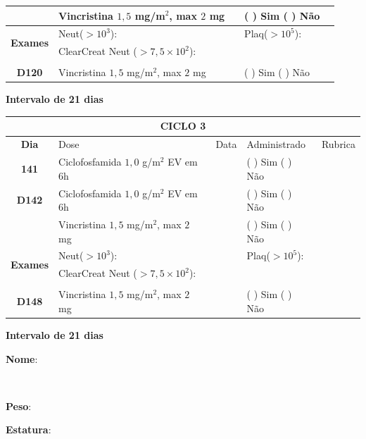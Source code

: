 \documentclass[11pt,a4paper,oldfontcommands]{memoir}
\def\entrywithlabel[#1]#2{\parbox{#1}{{\small #2:} \hrulefill}}
\begin{document}
\begin{center}
\begin{table}[H]
\begin{tabular}{p{1cm}p{6cm}|p{1cm}|p{3cm}|p{2.5cm}}
    \multicolumn{1}{c|}{\multirow{1}{*}{\textbf{}}}&{Vincristina \(1,5\) mg/m\(^2\), max \(2\) mg}&&{(  ) Sim (  ) Não}&\\
    \hline
    \multicolumn{1}{c|}{\multirow{2}{*}{\textbf{Exames}}}&\multicolumn{2}{l|}{Neut(\(>10^3\)):}&{Plaq(\(>10^5\)):}&\\
    \cline{2-5}
    \multicolumn{1}{c|}{\multirow{2}{*}{{}}}&\multicolumn{2}{l|}{ClearCreat Neut (\(>7,5\times10^2\)):}&{}&{}\\
    \hline
    \\
    \hline
    \multicolumn{1}{c|}{\multirow{1}{*}{\textbf{D120}}}&{Vincristina \(1,5\) mg/m\(^2\), max \(2\) mg}&&{(  ) Sim (  ) Não}&\\
    \hline
\end{tabular}
\end{table}
\textbf{Intervalo de 21 dias}

\begin{table}[H]
\begin{tabular}{p{1cm}p{6cm}|p{1cm}|p{3cm}|p{2.5cm}}
    \hline
	\multicolumn{5}{c}{\textbf{CICLO 3}}\\
	\hline
    \multicolumn{1}{c|}{\multirow{1}{*}{\textbf{Dia}}}&{Dose}&{Data}&{Administrado}&{Rubrica} \\
    \hline
    \multicolumn{1}{c|}{\multirow{1}{*}{\textbf{141}}}&{Ciclofosfamida \(1,0\) g/m\(^2\) EV em 6h}&&{(  ) Sim (  ) Não}&\\
    \multicolumn{1}{c|}{\multirow{1}{*}{\textbf{D142}}}&{Ciclofosfamida \(1,0\) g/m\(^2\) EV em 6h}&&{(  ) Sim (  ) Não}&\\
    \multicolumn{1}{c|}{\multirow{1}{*}{\textbf{}}}&{Vincristina \(1,5\) mg/m\(^2\), max \(2\) mg}&&{(  ) Sim (  ) Não}&\\
    \hline
    \multicolumn{1}{c|}{\multirow{2}{*}{\textbf{Exames}}}&\multicolumn{2}{l|}{Neut(\(>10^3\)):}&{Plaq(\(>10^5\)):}&\\
    \cline{2-5}
    \multicolumn{1}{c|}{\multirow{2}{*}{{}}}&\multicolumn{2}{l|}{ClearCreat Neut (\(>7,5\times10^2\)):}&{}&{}\\
    \hline
    \\
    \hline
    \multicolumn{1}{c|}{\multirow{1}{*}{\textbf{D148}}}&{Vincristina \(1,5\) mg/m\(^2\), max \(2\) mg}&&{(  ) Sim (  ) Não}&\\
    \hline
\end{tabular}
\end{table}
\textbf{Intervalo de 21 dias}

\pagebreak
    \noindent
\entrywithlabel[1\hsize]{\textbf{Nome}}\hfill
\\[0.3cm]
\entrywithlabel[.45\hsize]{\textbf{Peso}}\hfill  \entrywithlabel[.45\hsize]{\textbf{Estatura}}


\end{center}
\end{document}
